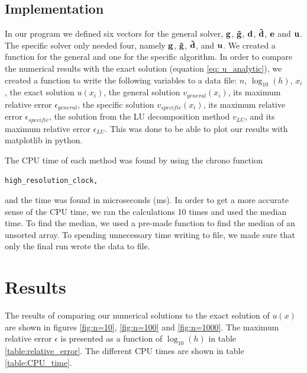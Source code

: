 \documentclass[english, nofootinbib]{revtex4-1}  %
\begin{document}
\subsection{Implementation}
In our program we defined  six vectors for the general solver, $\bf{g}$, $\bf{\tilde{g}}$, $\bf{d}$, $\bf{\tilde{d}}$, $\bf{e}$ and $\bf{u}$. The specific solver only needed four, namely $\bf{g}$, $\bf{\tilde{g}}$, $\bf{\tilde{d}}$, and $\bf{u}$. 
We created a function for the general and one for the specific algorithm. In order to compare the numerical results with the exact solution (equation \ref{eq: u_analytic}), we created a function to write the following variables to a data file: $n$, $\log_{10}(h)$, $x_i$, the exact solution $u(x_i)$, the general solution $v_{general}(x_i)$, its maximum relative error $\epsilon_{general}$, the specific solution $v_{specific}(x_i)$, its maximum relative error $\epsilon_{specific}$, the solution from the LU decomposition method $v_{LU}$, and its maximum relative error $\epsilon_{LU}$. This was done to be able to plot our results with matplotlib in python. 

The CPU time of each method was found by using the chrono function 
\begin{verbatim}
high_resolution_clock,
\end{verbatim}
and the time was found in microseconds (ms). In order to get a more accurate sense of the CPU time, we ran the calculations 10 times and used the median time. To find the median, we used a pre-made function to find the median of an unsorted array.\cite{median} To spending unnecessary time writing to file, we made sure that only the final run wrote the data to file.

\section{Results} \label{section: results}

The results of comparing our numerical solutions to the exact solution of $u(x)$ are shown in figures \ref{fig:n=10}, \ref{fig:n=100} and \ref{fig:n=1000}. 
The maximum relative error $\epsilon$ is presented as a function of $\log_{10}(h)$ in table \ref{table:relative_error}. The different CPU times are shown in table \ref{table:CPU_time}.
\end{document}
